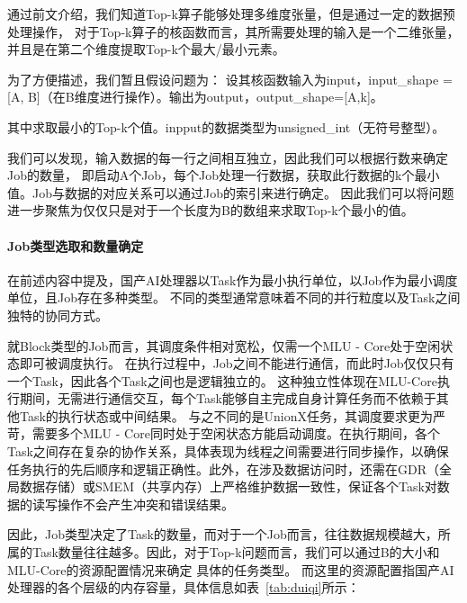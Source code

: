         通过前文介绍，我们知道Top-k算子能够处理多维度张量，但是通过一定的数据预处理操作，
        对于Top-k算子的核函数而言，其所需要处理的输入是一个二维张量，并且是在第二个维度提取Top-k个最大/最小元素。
        
        为了方便描述，我们暂且假设问题为：
        设其核函数输入为input，input\_shape = [A, B]（在B维度进行操作）。输出为output，output\_shape=[A,k]。

        其中求取最小的Top-k个值。inpput的数据类型为unsigned\_int（无符号整型）。
        
        我们可以发现，输入数据的每一行之间相互独立，因此我们可以根据行数来确定Job的数量，
        即启动A个Job，每个Job处理一行数据，获取此行数据的k个最小值。Job与数据的对应关系可以通过Job的索引来进行确定。
        因此我们可以将问题进一步聚焦为仅仅只是对于一个长度为B的数组来求取Top-k个最小的值。

        
        \paragraph{Job类型选取和数量确定}
        在前述内容中提及，国产AI处理器以Task作为最小执行单位，以Job作为最小调度单位，且Job存在多种类型。
        不同的类型通常意味着不同的并行粒度以及Task之间独特的协同方式。

        就Block类型的Job而言，其调度条件相对宽松，仅需一个MLU - Core处于空闲状态即可被调度执行。
        在执行过程中，Job之间不能进行通信，而此时Job仅仅只有一个Task，因此各个Task之间也是逻辑独立的。
        这种独立性体现在MLU-Core执行期间，无需进行通信交互，每个Task能够自主完成自身计算任务而不依赖于其他Task的执行状态或中间结果。
        与之不同的是UnionX任务，其调度要求更为严苛，需要多个MLU - Core同时处于空闲状态方能启动调度。在执行期间，各个Task之间存在复杂的协作关系，具体表现为线程之间需要进行同步操作，以确保任务执行的先后顺序和逻辑正确性。此外，在涉及数据访问时，还需在GDR（全局数据存储）或SMEM（共享内存）上严格维护数据一致性，保证各个Task对数据的读写操作不会产生冲突和错误结果。
        
        因此，Job类型决定了Task的数量，而对于一个Job而言，往往数据规模越大，所属的Task数量往往越多。因此，对于Top-k问题而言，我们可以通过B的大小和MLU-Core的资源配置情况来确定
        具体的任务类型。
        而这里的资源配置指国产AI处理器的各个层级的内存容量，具体信息如表~\ref{tab:duiqi}所示：

